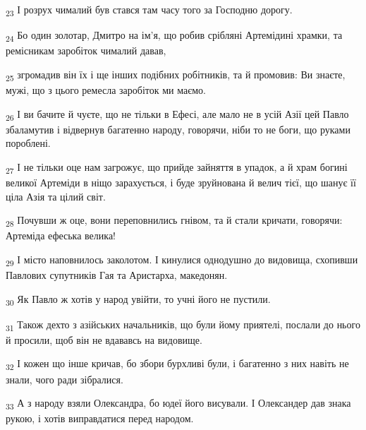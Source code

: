 \begin{tcolorbox}
\textsubscript{23} І розрух чималий був стався там часу того за Господню дорогу.
\end{tcolorbox}
\begin{tcolorbox}
\textsubscript{24} Бо один золотар, Дмитро на ім'я, що робив срібляні Артемідині храмки, та ремісникам заробіток чималий давав,
\end{tcolorbox}
\begin{tcolorbox}
\textsubscript{25} згромадив він їх і ще інших подібних робітників, та й промовив: Ви знаєте, мужі, що з цього ремесла заробіток ми маємо.
\end{tcolorbox}
\begin{tcolorbox}
\textsubscript{26} І ви бачите й чуєте, що не тільки в Ефесі, але мало не в усій Азії цей Павло збаламутив і відвернув багатенно народу, говорячи, ніби то не боги, що руками пороблені.
\end{tcolorbox}
\begin{tcolorbox}
\textsubscript{27} І не тільки оце нам загрожує, що прийде зайняття в упадок, а й храм богині великої Артеміди в ніщо зарахується, і буде зруйнована й велич тієї, що шанує її ціла Азія та цілий світ.
\end{tcolorbox}
\begin{tcolorbox}
\textsubscript{28} Почувши ж оце, вони переповнились гнівом, та й стали кричати, говорячи: Артеміда ефеська велика!
\end{tcolorbox}
\begin{tcolorbox}
\textsubscript{29} І місто наповнилось заколотом. І кинулися однодушно до видовища, схопивши Павлових супутників Гая та Аристарха, македонян.
\end{tcolorbox}
\begin{tcolorbox}
\textsubscript{30} Як Павло ж хотів у народ увійти, то учні його не пустили.
\end{tcolorbox}
\begin{tcolorbox}
\textsubscript{31} Також дехто з азійських начальників, що були йому приятелі, послали до нього й просили, щоб він не вдававсь на видовище.
\end{tcolorbox}
\begin{tcolorbox}
\textsubscript{32} І кожен що інше кричав, бо збори бурхливі були, і багатенно з них навіть не знали, чого ради зібралися.
\end{tcolorbox}
\begin{tcolorbox}
\textsubscript{33} А з народу взяли Олександра, бо юдеї його висували. І Олександер дав знака рукою, і хотів виправдатися перед народом.
\end{tcolorbox}
